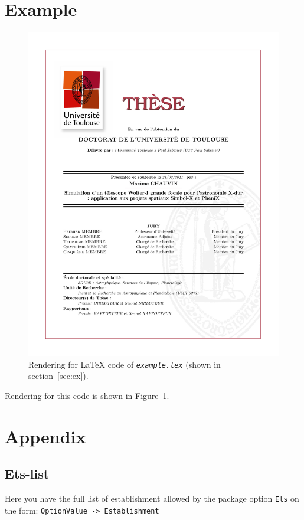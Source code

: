 \documentclass{scrartcl}
\newcommand*{\file}[1]{\textit{\texttt{#1}}}
\begin{document}
\section{Example\label{sec:ex}}

\begin{figure}[h!]
    \centering
    \includegraphics[width=\textwidth]{example.pdf}
    \caption{\label{fig:ex}
        Rendering for \LaTeX{} code of \file{example.tex} (shown in section~\ref{sec:ex}).
    }
\end{figure}
Rendering for this code is shown in Figure~\ref{fig:ex}.

\section*{Appendix}
\subsection{Ets-list\label{ssec:Ets}}
Here you have the full list of establishment allowed by the package option \texttt{Ets} on the form:
\texttt{OptionValue -> Establishment}

\end{document}
